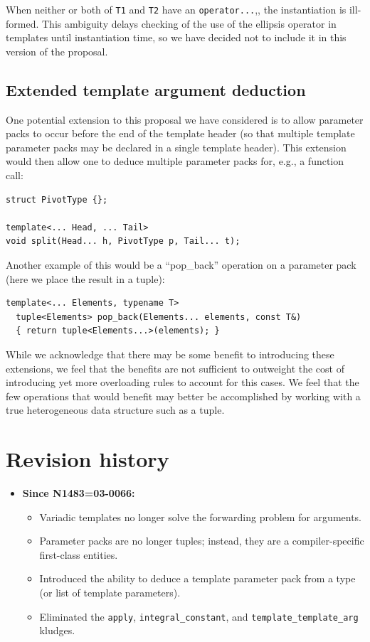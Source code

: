 \documentclass{article}
\begin{document}
When neither or both of \texttt{T1} and \texttt{T2} have an
\texttt{operator...},, the instantiation is ill-formed. This ambiguity
delays checking of the use of the ellipsis operator in templates until
instantiation time, so we have decided not to include it in this
version of the proposal.

\subsection{Extended template argument deduction}
One potential extension to this proposal we have considered is to
allow parameter packs to occur before the end of the template header
(so that multiple template parameter packs may be declared in a single
template header). This extension would then allow one to deduce
multiple parameter packs for, e.g., a function call:

\begin{verbatim}
struct PivotType {};

template<... Head, ... Tail>
void split(Head... h, PivotType p, Tail... t);
\end{verbatim}

Another example of this would be a ``pop\_back'' operation on a
parameter pack (here we place the result in a tuple):

\begin{verbatim}
template<... Elements, typename T>
  tuple<Elements> pop_back(Elements... elements, const T&)
  { return tuple<Elements...>(elements); }
\end{verbatim}

While we acknowledge that there may be some benefit to introducing
these extensions, we feel that the benefits are not sufficient to
outweight the cost of introducing yet more overloading rules to
account for this cases. We feel that the few operations that would
benefit may better be accomplished by working with a true
heterogeneous data structure such as a tuple.

\section{Revision history}
\begin{itemize}
\item \textbf{Since N1483=03-0066:} 
  \begin{itemize}
  \item Variadic templates no longer solve the forwarding problem for
    arguments. 
  \item Parameter packs are no longer tuples; instead, they are a
    compiler-specific first-class entities.
  \item Introduced the ability to deduce a template parameter pack
    from a type (or list of template parameters).
  \item Eliminated the \texttt{apply}, \texttt{integral\_constant},
    and \texttt{template\_template\_arg} kludges.
  \end{itemize}
\end{itemize}
\end{document}
